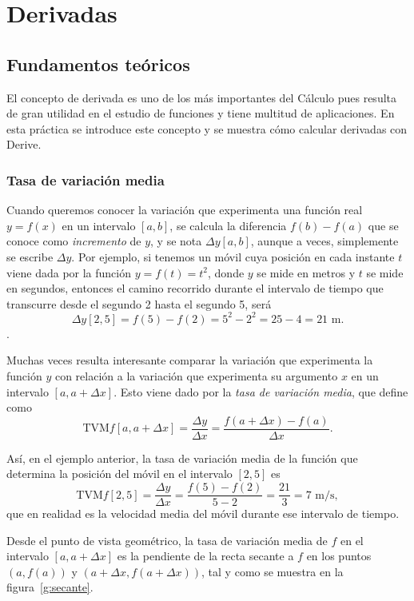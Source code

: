 
\chapter{Derivadas}

\section{Fundamentos teóricos}
El concepto de derivada es uno de los más importantes del Cálculo pues resulta
de gran utilidad en el estudio de funciones y tiene multitud de aplicaciones.
En esta práctica se introduce este concepto y se muestra cómo calcular derivadas con Derive.

\subsection*{Tasa de variación media}
Cuando queremos conocer la variación que experimenta una función real $y=f(x)$ en un intervalo $[a,b]$, se calcula la diferencia $f(b)-f(a)$ que se conoce como \emph{incremento} de $y$, y se nota $\Delta y[a,b]$, aunque a veces, simplemente se escribe $\Delta y$. Por ejemplo, si tenemos un móvil cuya posición en cada instante $t$ viene dada por la función $y=f(t)=t^2$, donde $y$ se mide en metros y $t$ se mide en segundos, entonces el camino recorrido durante el intervalo de tiempo que transcurre desde el segundo 2 hasta el segundo 5, será
\[\Delta y[2,5]=f(5)-f(2)=5^2-2^2=25-4=21 \textrm{ m}.\].

Muchas veces resulta interesante comparar la variación que experimenta la función $y$ con relación a la variación que experimenta su argumento $x$ en un intervalo $[a,a+\Delta x]$. Esto viene dado por la \emph{tasa de variación media}, que define como
\[
\textrm{TVM} f[a,a+\Delta x]=\frac{\Delta y}{\Delta x}=\frac{f(a+\Delta x)-f(a)}{\Delta x}.
\]

Así, en el ejemplo anterior, la tasa de variación media de la función que determina la posición del móvil en el intervalo $[2,5]$ es
\[\textrm{TVM} f[2,5]=\frac{\Delta y}{\Delta x}=\frac{f(5)-f(2)}{5-2}=\frac{21}{3}=7\textrm{ m/s},\]
que en realidad es la velocidad media del móvil durante ese intervalo de tiempo.

Desde el punto de vista geométrico, la tasa de variación media de $f$ en el intervalo $[a , a+\Delta x]$ es la pendiente de la recta secante a $f$ en los puntos $(a , f(a))$ y $(a+\Delta x, f(a+\Delta x))$, tal y como se muestra en la figura~\ref{g:secante}.

